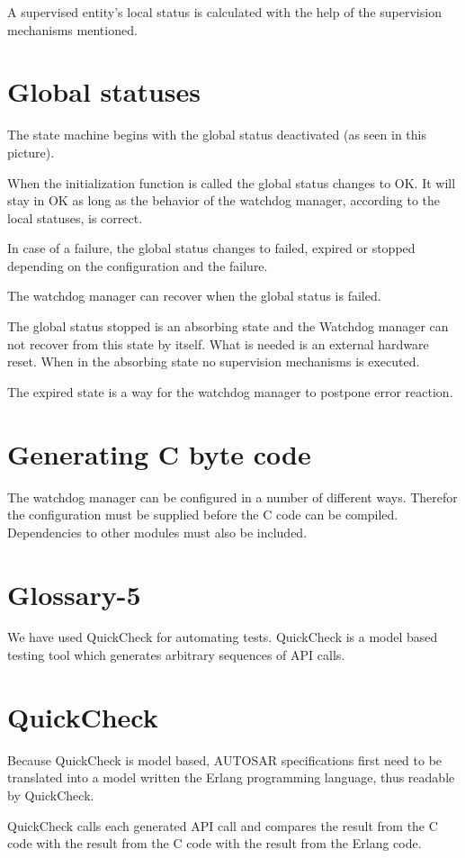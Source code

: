 \documentclass[a4paper]{article}
\begin{document}
A supervised entity's local status is calculated with the help of the
supervision mechanisms mentioned.

\section{Global statuses}
The state machine begins with the global status deactivated (as seen
in this picture).

When the initialization function is called the global status changes
to OK.
It will stay in OK as long as the behavior of the watchdog manager,
according to the local statuses, is correct.

In case of a failure, the global status changes to failed, expired or
stopped depending on the configuration and the failure.

The watchdog manager can recover when the global status is failed.

The global status stopped is an absorbing state and the Watchdog
manager can not recover from this state by itself. What is needed is
an external hardware reset. When in the absorbing state no supervision
mechanisms is executed.

The expired state is a way for the watchdog manager to postpone error
reaction.

\section{Generating C byte code}
The watchdog manager can be configured in a number of different
ways. Therefor the configuration must be supplied before the C code
can be compiled. Dependencies to other modules must also be included.

\section{Glossary-5}
We have used QuickCheck for automating tests. QuickCheck is a model
based testing tool which generates arbitrary sequences of API calls.

\section{QuickCheck}
Because QuickCheck is model based, AUTOSAR specifications first need
to be translated into a model written the Erlang programming language,
thus readable by QuickCheck.

QuickCheck calls each generated API call and compares the result from
the C code with the result from the C code with the result from the
Erlang code.
\end{document}
